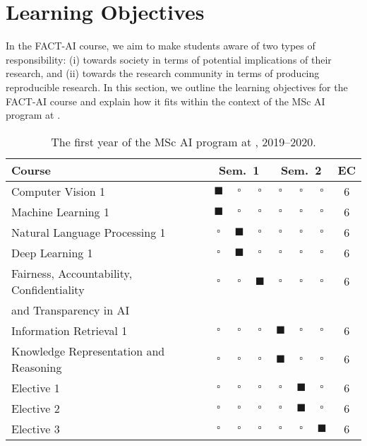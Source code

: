 

\section{Learning Objectives}
\label{section:learning-objectives}

In the FACT-AI course, we aim to make students aware of two types of responsibility: (i) towards society in terms of potential implications of their research, and (ii) towards the research community in terms of producing reproducible research. 
In this section, we outline the learning objectives for the FACT-AI course and explain how it fits within the context of the MSc AI program at \OurUniversity{}. 

\begin{table}[t]
\caption{The first year of the MSc AI program at \OurUniversity{}, 2019--2020.}
\label{tab:msc_program}
\centering
\setlength{\tabcolsep}{3pt}
\begin{tabular}{l c@{~}c@{~}c c@{~}c@{~}c c}
\toprule
Course & \multicolumn{3}{c}{Sem.\ 1} & \multicolumn{3}{c}{Sem.\ 2} & EC \\
\midrule
     Computer Vision 1 & $\blacksquare$ & $\square$ & $\square$ & $\square$ & $\square$ & $\square$ & 6 \\
     Machine Learning 1 & $\blacksquare$ & $\square$ & $\square$ & $\square$ & $\square$ & $\square$ & 6 \\
     Natural Language Processing 1 & $\square$ & $\blacksquare$ & $\square$ & $\square$ & $\square$ & $\square$ & 6 \\
     Deep Learning 1 & $\square$ & $\blacksquare$ & $\square$ & $\square$ & $\square$ & $\square$ & 6\\
     Fairness, Accountability, Confidentiality  & $\square$ & $\square$ & $\blacksquare$ & $\square$ & $\square$ & $\square$ & 6 \\
     and Transparency in AI \\
     Information Retrieval 1 & $\square$ & $\square$ & $\square$ & $\blacksquare$ & $\square$ & $\square$ & 6 \\
     Knowledge Representation and Reasoning & $\square$ & $\square$ & $\square$ & $\blacksquare$ & $\square$ & $\square$ & 6 \\
     Elective 1 & $\square$ & $\square$ & $\square$ & $\square$ & $\blacksquare$ & $\square$ & 6 \\
     Elective 2 & $\square$ & $\square$ & $\square$ & $\square$ & $\blacksquare$ & $\square$ & 6 \\
     Elective 3 & $\square$ & $\square$ & $\square$ & $\square$ & $\square$ & $\blacksquare$ & 6 \\
\bottomrule
\end{tabular}
\end{table}


